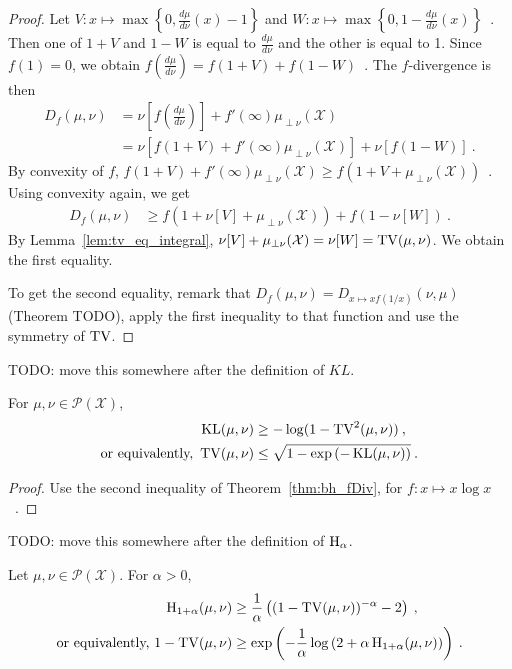 \begin{proof}%
{}
Let $V: x \mapsto \max\left\{0, \frac{d\mu}{d\nu}(x) - 1\right\}$ and $W: x \mapsto \max\left\{0, 1 - \frac{d\mu}{d\nu}(x)\right\}$~.
Then one of $1+V$ and $1-W$ is equal to $\frac{d\mu}{d\nu}$ and the other is equal to 1.
Since $f(1) = 0$, we obtain $f(\frac{d\mu}{d\nu}) = f(1+V) + f(1-W)$~.
The $f$-divergence is then
\begin{align*}
D_f(\mu, \nu)
&= \nu[f(\frac{d\mu}{d\nu})] + f'(\infty)\mu_{\perp \nu}(\mathcal X)
\\
&= \nu\left[f(1+V) + f'(\infty)\mu_{\perp \nu}(\mathcal X)\right] + \nu\left[f(1 - W)\right]
\: .
\end{align*}
By convexity of $f$, $f(1+V) + f'(\infty)\mu_{\perp \nu}(\mathcal X) \ge f(1+V + \mu_{\perp \nu}(\mathcal X))$~. Using convexity again, we get
\begin{align*}
D_f(\mu, \nu)
&\ge f(1+ \nu[V] + \mu_{\perp \nu}(\mathcal X)) + f(1 - \nu[W])
\: .
\end{align*}
By Lemma~\ref{lem:tv_eq_integral}, $\nu[V] + \mu_{\perp \nu}(\mathcal X) = \nu[W] = \operatorname{TV}(\mu, \nu)$. We obtain the first equality.

To get the second equality, remark that $D_f(\mu, \nu) = D_{x\mapsto xf(1/x)}(\nu, \mu)$ (Theorem TODO), apply the first inequality to that function and use the symmetry of $\operatorname{TV}$.
\end{proof}

\begin{corollary}
  \label{cor:bh_kl}
  TODO: move this somewhere after the definition of $KL$.

  For $\mu, \nu \in \mathcal P(\mathcal X)$,
  \begin{align*}
  \operatorname{KL}(\mu, \nu)
  &\ge - \log(1 - \operatorname{TV}^2(\mu, \nu))
  \: , \\
  \text{or equivalently, }
  \operatorname{TV}(\mu, \nu)
  &\le \sqrt{1 - \exp\left(-\operatorname{KL}(\mu, \nu) \right)}
  \: .
  \end{align*}
\end{corollary}

\begin{proof}%
{}
Use the second inequality of Theorem~\ref{thm:bh_fDiv}, for $f: x \mapsto x \log x$~.
\end{proof}

\begin{corollary}
  \label{cor:cor:bh_hellingerAlpha}
  TODO: move this somewhere after the definition of $\operatorname{H}_\alpha$.

  Let $\mu, \nu \in \mathcal P(\mathcal X)$. For $\alpha > 0$,
  \begin{align*}
  \operatorname{H}_{1+\alpha}(\mu, \nu)
  &\ge \frac{1}{\alpha} \left( (1 - \operatorname{TV}(\mu, \nu))^{-\alpha} - 2 \right)
  \: , \\
  \text{or equivalently, }
  1 - \operatorname{TV}(\mu, \nu)
  &\ge \exp\left(-\frac{1}{\alpha} \log \left( 2 + \alpha \operatorname{H}_{1+\alpha}(\mu, \nu) \right)\right)
  \: .
  \end{align*}
\end{corollary}

